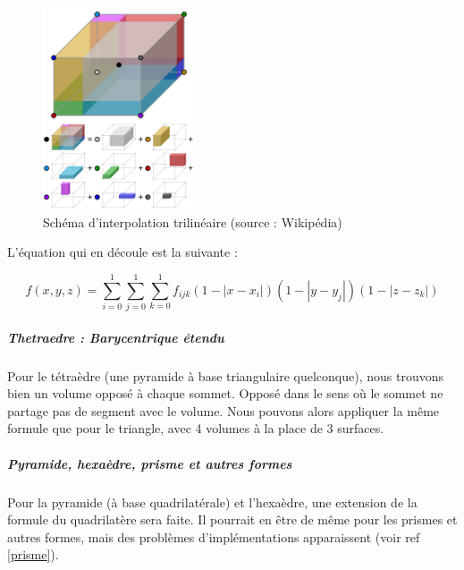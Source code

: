 \begin{figure}[H]
    \centering
    \includegraphics[width=0.4\textwidth]{images/Trilinear_interpolation_visualisation.svg.png}
    \caption{Schéma d'interpolation trilinéaire (source : Wikipédia)} %
\end{figure}

L'équation qui en découle est la suivante :

\begin{equation}
    f(x, y, z) = \sum_{i=0}^{1} \sum_{j=0}^{1} \sum_{k=0}^{1} f_{ijk} (1 - |x - x_i|)(1 - |y - y_j|)(1 - |z - z_k|)
\end{equation}



\subparagraph{Thetraedre : Barycentrique étendu}

Pour le tétraèdre (une pyramide à base triangulaire quelconque), nous trouvons bien un volume opposé à chaque sommet. Opposé dans le sens où le sommet ne partage pas de segment avec le volume. Nous pouvons alors appliquer la même formule que pour le triangle, avec 4 volumes à la place de 3 surfaces.

\subparagraph{Pyramide, hexaèdre, prisme et autres formes}

Pour la pyramide (à base quadrilatérale) et l’hexaèdre, une extension de la formule du quadrilatère sera faite.
Il pourrait en être de même pour les prismes et autres formes, mais des problèmes d'implémentations apparaissent (voir ref \ref{prisme}).


